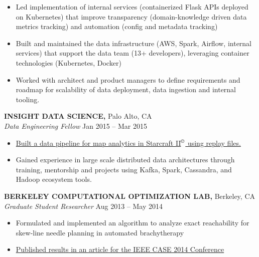 \documentclass[geomargin]{res}
\begin{document}
\begin{resume}
\begin{itemize}
  \item Led implementation of internal services (containerized Flask APIs deployed on Kubernetes) that improve transparency (domain-knowledge driven data metrics tracking) and automation (config and metadata tracking)

  \item Built and maintained the data infrastructure (AWS, Spark, Airflow, internal services) that support the data team (13+ developers), leveraging container technologies (Kubernetes, Docker)

  \item Worked with architect and product managers to define requirements and roadmap for scalability of data deployment, data ingestion and internal tooling.

\end{itemize}
\vspace{-1mm}

{\bf INSIGHT DATA SCIENCE,} Palo Alto, CA \\
{\em Data Engineering Fellow} \hfill
Jan 2015 -- Mar 2015 \\                                          \vspace{-4mm}
\begin{itemize}                                         \itemsep1pt %
  \item \href{https://github.com/guang/stargazer}
    {Built a data pipeline for map analytics in Starcraft II\(^\copyright\)
     using replay files.}

  \item Gained experience in large scale distributed data architectures through training,
    mentorship and projects using Kafka, Spark, Cassandra, and Hadoop ecosystem tools.
\end{itemize}
\vspace{-1mm}

{\bf BERKELEY COMPUTATIONAL OPTIMIZATION LAB,} Berkeley, CA \\
{\em Graduate Student Researcher} \hfill
Aug 2013 -- May 2014 \\                                          \vspace{-4mm}
\begin{itemize}                                         \itemsep1pt %
        \item    Formulated and implemented an algorithm to analyze exact reachability for skew-line needle planning in automated brachytherapy
        \item    \href{http://ieeexplore.ieee.org/abstract/document/6899376/}{Published results in an article for the IEEE CASE 2014 Conference}
\end{itemize}
\vspace{-1mm}



\end{resume}
\end{document}
